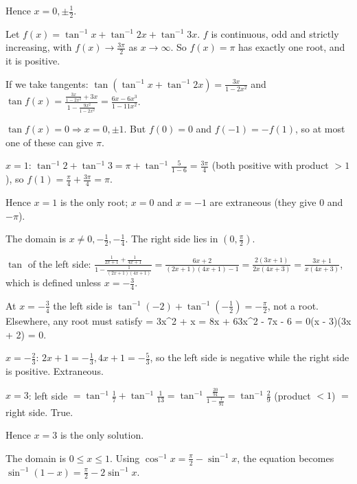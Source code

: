   Hence $x = 0, \pm\frac{1}{2}$.
\item Let $f(x) = \tan^{-1}x + \tan^{-1}2x + \tan^{-1}3x$. $f$ is continuous, odd and strictly increasing, with
  $f(x)\rightarrow\frac{3\pi}{2}$ as $x\rightarrow\infty$. So $f(x) = \pi$ has exactly one root, and it is positive.

  If we take tangents: $\tan(\tan^{-1}x + \tan^{-1}2x) = \frac{3x}{1 - 2x^2}$ and $\tan f(x) = \frac{\frac{3x}{1 -
  2x^2} + 3x}{1 - \frac{9x^2}{1 - 2x^2}} = \frac{6x - 6x^3}{1 - 11x^2}$.

  $\tan f(x) = 0\Rightarrow x = 0, \pm1$. But $f(0) = 0$ and $f(-1) = -f(1)$, so at most one of these can give
  $\pi$.

  $x = 1$: $\tan^{-1}2 + \tan^{-1}3 = \pi + \tan^{-1}\frac{5}{1 - 6} = \frac{3\pi}{4}$ (both positive with product
  $> 1$), so $f(1) = \frac{\pi}{4} + \frac{3\pi}{4} = \pi$.

  Hence $x = 1$ is the only root; $x = 0$ and $x = -1$ are extraneous (they give $0$ and $-\pi$).
\item The domain is $x\neq 0, -\frac{1}{2}, -\frac{1}{4}$. The right side lies in $\left(0, \frac{\pi}{2}\right)$.

  $\tan$ of the left side: $\frac{\frac{1}{2x + 1} + \frac{1}{4x + 1}}{1 - \frac{1}{(2x + 1)(4x + 1)}} = \frac{6x
  + 2}{(2x + 1)(4x + 1) - 1} = \frac{2(3x + 1)}{2x(4x + 3)} = \frac{3x + 1}{x(4x + 3)}$, which is defined unless $x
  = -\frac{3}{4}$.

  At $x = -\frac{3}{4}$ the left side is $\tan^{-1}(-2) + \tan^{-1}\left(-\frac{1}{2}\right) = -\frac{\pi}{2}$, not a
  root. Elsewhere, any root must satisfy
  \startformula
     = \Rightarrow 3x^2 + x = 8x + 6\Rightarrow 3x^2 - 7x - 6 = 0\Rightarrow (x - 3)(3x + 2) = 0.
  \stopformula

  $x = -\frac{2}{3}$: $2x + 1 = -\frac{1}{3}, 4x + 1 = -\frac{5}{3}$, so the left side is negative while the right
  side is positive. Extraneous.

  $x = 3$: left side $= \tan^{-1}\frac{1}{7} + \tan^{-1}\frac{1}{13} = \tan^{-1}\frac{\frac{20}{91}}{1 -
  \frac{1}{91}} = \tan^{-1}\frac{2}{9}$ (product $< 1$) $=$ right side. True.

  Hence $x = 3$ is the only solution.
\item The domain is $0\le x\le 1$. Using $\cos^{-1}x = \frac{\pi}{2} - \sin^{-1}x$, the equation becomes
  $\sin^{-1}(1 - x) = \frac{\pi}{2} - 2\sin^{-1}x$.


